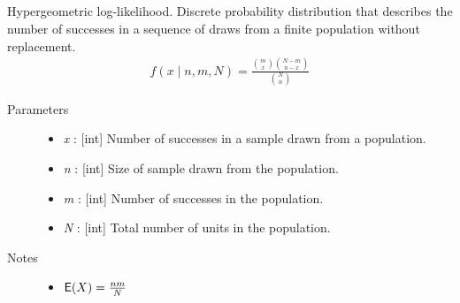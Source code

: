 \documentclass[]{jss}
\begin{document}
\subsection[hypergeometric]{} 

Hypergeometric log-likelihood. Discrete probability distribution that
describes the number of successes in a sequence of draws from a finite
population without replacement.
\begin{eqnarray*}
f(x \mid n, m, N) = \frac{\binom{m}{x}\binom{N-m}{n-x}}{\binom{N}{n}}
\end{eqnarray*}
\begin{description}    
\item[Parameters] \leavevmode\begin{itemize}
\item {} 
\emph{x} : {[}int{]} Number of successes in a sample drawn from a population.

\item {} 
\emph{n} : {[}int{]} Size of sample drawn from the population.

\item {} 
\emph{m} : {[}int{]} Number of successes in the population.

\item {} 
\emph{N} : {[}int{]} Total number of units in the population.

\end{itemize}

\item[Notes] \leavevmode\begin{itemize}
\item $\mathsf{E}(X) = \frac{n m}{N}$
\end{itemize}

\end{description}
\end{document}
